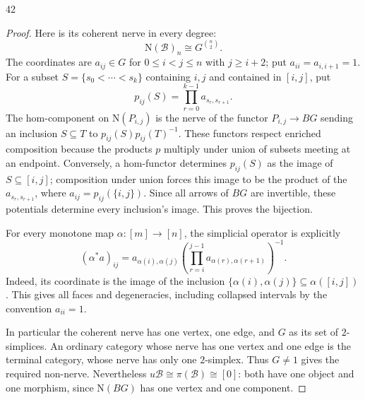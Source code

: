 \begin{exercise}{42}
\begin{proof}
Here is its coherent nerve in every degree:
\[
 \mathrm{N}(\mathcal B)_n\cong G^{\binom n2}.
\]
The coordinates are $a_{ij}\in G$ for $0\le i<j\le n$
with $j\ge i+2$; put $a_{ii}=a_{i,i+1}=1$.
For a subset $S=\{s_0<\cdots<s_k\}$ containing $i,j$
and contained in $[i,j]$, put
\[
 p_{ij}(S)=\prod_{r=0}^{k-1}a_{s_r,s_{r+1}}.
\]
The hom-component on $\mathrm{N}(P_{i,j})$ is the nerve of
the functor $P_{i,j}\to BG$ sending an inclusion $S\subseteq T$ to
$p_{ij}(S)p_{ij}(T)^{-1}$.
These functors respect enriched composition because the products
$p$ multiply under union of subsets meeting at an endpoint.
Conversely, a hom-functor determines
$p_{ij}(S)$ as the image of $S\subseteq[i,j]$;
composition under union forces this image to be the product
of the $a_{s_r,s_{r+1}}$, where
$a_{ij}=p_{ij}(\{i,j\})$.
Since all arrows of $BG$ are invertible, these potentials
determine every inclusion's image. This proves the bijection.

For every monotone map $\alpha\colon[m]\to[n]$, the simplicial
operator is explicitly
\[
 (\alpha^*a)_{ij}
 =a_{\alpha(i),\alpha(j)}
  \left(\prod_{r=i}^{j-1}a_{\alpha(r),\alpha(r+1)}\right)^{-1}.
\]
Indeed, its coordinate is the image of the inclusion
$\{\alpha(i),\alpha(j)\}\subseteq\alpha([i,j])$.
This gives all faces and degeneracies, including collapsed
intervals by the convention $a_{ii}=1$.

In particular the coherent nerve has one vertex, one edge,
and $G$ as its set of $2$-simplices.
An ordinary category whose nerve has one vertex and one edge
is the terminal category, whose nerve has only one $2$-simplex.
Thus $G\ne1$ gives the required non-nerve.
Nevertheless $u\mathcal B\cong\pi(\mathcal B)\cong[0]$:
both have one object and one morphism, since
$\mathrm{N}(BG)$ has one vertex and one component.
\end{proof}
\end{exercise}
